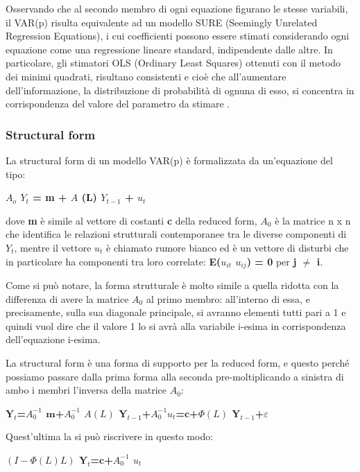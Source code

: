 \documentclass[12pt,a4paper,twoside,openright]{book}
\begin{document}
Osservando che al secondo membro di ogni equazione figurano le stesse variabili, il VAR(p) risulta equivalente ad un modello SURE (Seemingly Unrelated Regression Equations), i cui coefficienti possono essere stimati considerando ogni equazione come una regressione lineare standard, indipendente dalle altre. In particolare, gli stimatori OLS (Ordinary Least Squares) ottenuti con il metodo dei minimi quadrati, risultano consistenti e cioè che all'aumentare dell'informazione, la distribuzione di probabilità di ognuna di esso, si concentra in corrispondenza del valore del parametro da stimare \cite{11a}.
\subsubsection{Structural form}
La structural form di un modello VAR(p) è formalizzata da un'equazione del tipo:
\begin{center}
{\bfseries 
$A_o$ $Y_t$ = m + $A$ (L) $Y_{t-1}$ + $u_t$
}
\end{center}
dove {\bfseries m} è simile al vettore di costanti {\bfseries c} della reduced form, {\bfseries $A_0$} è la matrice n x n che identifica le relazioni strutturali contemporanee tra le diverse componenti di {\bfseries $Y_t$}, mentre il vettore {\bfseries $u_t$} è chiamato rumore bianco ed è un vettore di disturbi che in particolare ha componenti tra loro correlate: {\bfseries E($u_{it}$ $u_{ij}$) = 0} per {\bfseries j $\neq$ i}.

Come si può notare, la forma strutturale è molto simile a quella ridotta con la differenza di avere la matrice $A_0$ al primo membro: all'interno di essa, e precisamente, sulla sua diagonale principale, si avranno elementi tutti pari a 1 e quindi vuol dire che il valore 1 lo si avrà alla variabile i-esima in corrispondenza dell'equazione i-esima. 

La structural form è una forma di supporto per la reduced form, e questo perché possiamo passare dalla prima forma alla seconda pre-moltiplicando a sinistra di ambo i membri l'inversa della matrice $A_0$:
\begin{center}
{\bfseries
$\mathbf{Y}_t$=$A_0^{-1}$ $\mathbf{m}$+$A_0^{-1}$ $A(L)$ $\mathbf{Y}_{t-1}$+$A_0^{-1}u_t$=$\mathbf{c}$+$\Phi(L)$ $\mathbf{Y}_{t-1}$+$\varepsilon$
}
\end{center}

Quest'ultima la si può riscrivere in questo modo:
\begin{center}
{\bfseries
$\left(I-\Phi(L)L\right)$ $\mathbf{Y}_t$=$\mathbf{c}$+$A_0^{-1}$ $u_t$
}
\end{center}
\end{document}
